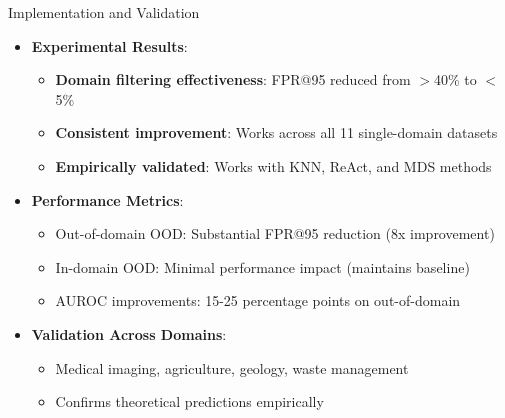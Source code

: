 \documentclass[aspectratio=169]{beamer}
\begin{document}
\begin{frame}{Implementation and Validation}
\begin{itemize}
    \item \textbf{Experimental Results}:
    \begin{itemize}
        \item \textbf{Domain filtering effectiveness}: FPR@95 reduced from $>$40\% to $<$5\%
        \item \textbf{Consistent improvement}: Works across all 11 single-domain datasets
        \item \textbf{Empirically validated}: Works with KNN, ReAct, and MDS methods
    \end{itemize}
    \item \textbf{Performance Metrics}:
    \begin{itemize}
        \item Out-of-domain OOD: Substantial FPR@95 reduction (8x improvement)
        \item In-domain OOD: Minimal performance impact (maintains baseline)
        \item AUROC improvements: 15-25 percentage points on out-of-domain
    \end{itemize}
    \item \textbf{Validation Across Domains}:
    \begin{itemize}
        \item Medical imaging, agriculture, geology, waste management
        \item Confirms theoretical predictions empirically
    \end{itemize}
\end{itemize}
\end{frame}
\end{document}

